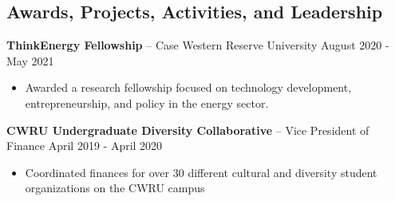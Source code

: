 \documentclass{res}
\begin{document}
\begin{resume}
\section{Awards, Projects, Activities, and Leadership} 
{\large{\bf  ThinkEnergy Fellowship } – Case Western Reserve University  \hfill    August 2020 - May 2021 }
\begin{itemize} \itemsep -2pt
	\item Awarded a research fellowship focused on technology development, entrepreneurship, and policy in the energy sector.
\end{itemize}
{\large{\bf  CWRU Undergraduate Diversity Collaborative} – Vice President of Finance     \hfill    April 2019 - April 2020 }
 \begin{itemize} \itemsep -2pt
 \item Coordinated finances for over 30 different cultural and diversity student organizations on the CWRU campus 
 \end{itemize}

		

\end{resume} 
\end{document}
